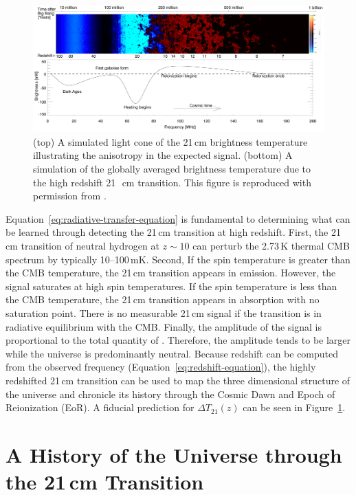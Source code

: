 \begin{bibunit}
\begin{figure}[t]
    \centering
    \includegraphics[width=\textwidth]{figures/chapter1/pritchard-2012-global-signal}
    \caption{
        (top) A simulated light cone of the 21\,cm brightness temperature illustrating the
        anisotropy in the expected signal.
        (bottom) A simulation of the globally averaged brightness temperature due to the high
        redshift 21\,~cm transition.
        This figure is reproduced with permission from \citet{2012RPPh...75h6901P}.
    }
    \label{fig:pritchard-global-signal}
\end{figure}

Equation~\ref{eq:radiative-transfer-equation} is fundamental to determining what can be learned
through detecting the 21\,cm transition at high redshift. First, the 21\,cm transition of neutral
hydrogen at $z\sim 10$ can perturb the 2.73\,K thermal CMB spectrum by typically 10--100\,mK.
Second, If the spin temperature is greater than the CMB temperature, the 21\,cm transition appears
in emission. However, the signal saturates at high spin temperatures. If the spin temperature is
less than the CMB temperature, the 21\,cm transition appears in absorption with no saturation point.
There is no measurable 21\,cm signal if the transition is in radiative equilibrium with the CMB.
Finally, the amplitude of the signal is proportional to the total quantity of . Therefore,
the amplitude tends to be larger while the universe is predominantly neutral.  Because redshift can
be computed from the observed frequency (Equation~\ref{eq:redshift-equation}), the highly redshifted
21\,cm transition can be used to map the three dimensional structure of the universe and chronicle
its history through the Cosmic Dawn and Epoch of Reionization (EoR).  A fiducial prediction for
$\Delta T_{21}(z)$ can be seen in Figure~\ref{fig:pritchard-global-signal}.

\section{A History of the Universe through the 21\,cm Transition}


\end{bibunit}
